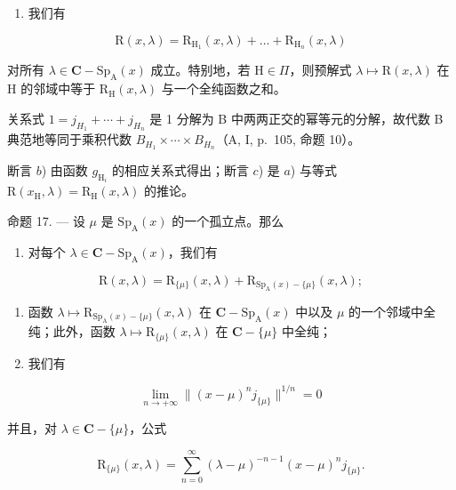 \begin{enumerate}
\def\labelenumi{\alph{enumi})}
\setcounter{enumi}{2}
\tightlist
\item
  我们有
\end{enumerate}

\[
\mathrm{R} (x, \lambda) = \mathrm{R} _ {\mathrm{H} _ {1}} (x, \lambda) + \dots + \mathrm{R} _ {\mathrm{H} _ {n}} (x, \lambda)\tag{19}
\]

对所有 \(\lambda\in\mathbf{C}-\mathrm{Sp}_{\mathrm{A}}(x)\) 成立。特别地，若 \(\mathrm{H}\in\Pi\)，则预解式 \(\lambda\mapsto\mathrm{R}(x,\lambda)\) 在 \(\mathrm{H}\) 的邻域中等于 \(\mathrm{R}_{\mathrm{H}}(x,\lambda)\) 与一个全纯函数之和。

关系式 \(1 = j_{H_{1}} + \cdots + j_{H_{n}}\) 是 1 分解为 B 中两两正交的幂等元的分解，故代数 B 典范地等同于乘积代数 \(B_{H_{1}} \times \cdots \times B_{H_{n}}\)（A, I, p.~105, 命题 10）。

断言 \(b\)) 由函数 \(g_{\mathrm{H}_i}\) 的相应关系式得出；断言 \(c\)) 是 \(a\)) 与等式 \(\mathrm{R}(x_{\mathrm{H}},\lambda) = \mathrm{R}_{\mathrm{H}}(x,\lambda)\) 的推论。

命题 17. --- 设 \(\mu\) 是 \(\mathrm{Sp}_{\mathrm{A}}(x)\) 的一个孤立点。那么

\begin{enumerate}
\def\labelenumi{\alph{enumi})}
\tightlist
\item
  对每个 \(\lambda \in \mathbf{C} - \mathrm{Sp}_{\mathrm{A}}(x)\)，我们有
\end{enumerate}

\[
\mathrm{R} (x, \lambda) = \mathrm{R} _ {\{\mu \}} (x, \lambda) + \mathrm{R} _ {\mathrm{Sp} _ {\mathrm{A}} (x) - \{\mu \}} (x, \lambda);
\]

\begin{enumerate}
\def\labelenumi{\alph{enumi})}
\setcounter{enumi}{1}
\item
  函数 \(\lambda \mapsto \mathrm{R}_{\mathrm{Sp}_{\mathrm{A}}(x)-\{\mu\}}(x,\lambda)\) 在 \(\mathbf{C}-\mathrm{Sp}_{\mathrm{A}}(x)\) 中以及 \(\mu\) 的一个邻域中全纯；此外，函数 \(\lambda \mapsto \mathrm{R}_{\{\mu\}}(x,\lambda)\) 在 \(\mathbf{C}-\{\mu\}\) 中全纯；
\item
  我们有
\end{enumerate}

\[
\lim _ {n \to + \infty} \| (x - \mu) ^ {n} j _ {\{\mu \}} \| ^ {1 / n} = 0
\]

并且，对 \(\lambda \in \mathbf{C} - \{\mu\}\)，公式

\[
\mathrm{R} _ {\{\mu \}} (x, \lambda) = \sum_ {n = 0} ^ {\infty} (\lambda - \mu) ^ {- n - 1} (x - \mu) ^ {n} j _ {\{\mu \}}.\tag{20}
\]

